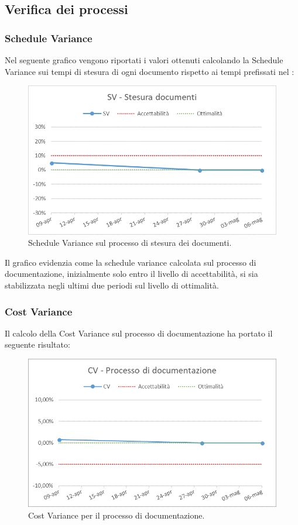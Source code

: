\subsection{Verifica dei processi}
\subsubsection{Schedule Variance}
Nel seguente grafico vengono riportati i valori ottenuti calcolando la Schedule Variance sui tempi di stesura di ogni documento rispetto ai tempi prefissati nel \PdP{}:

\begin{figure}[h!]
	\centering
	\includegraphics[scale=0.75]{img/Grafici/SV-Documenti.png}
		\caption{Schedule Variance sul processo di stesura dei documenti.}
	\label{fig:SV-Documenti}
\end{figure}
 
	Il grafico evidenzia come la schedule variance calcolata sul processo di documentazione, inizialmente solo entro il livello di accettabilità, si sia stabilizzata negli ultimi due periodi sul livello di ottimalità.

\subsubsection{Cost Variance}
Il calcolo della Cost Variance sul processo di documentazione ha portato il seguente risultato: 

\begin{figure}[h!]
	\centering
	\includegraphics[scale=0.75]{img/Grafici/CV-S-Documenti.png}
	\caption{Cost Variance per il processo di documentazione.}
	\label{fig:CV-Documenti}
\end{figure}

